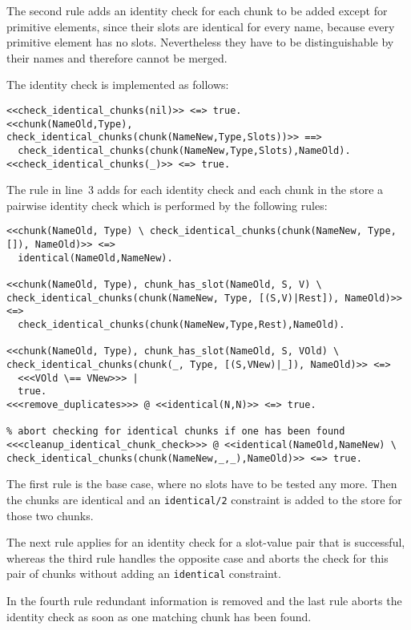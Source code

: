The second rule adds an identity check for each chunk to be added except for primitive elements, since their slots are identical for every name, because every primitive element has no slots. Nevertheless they have to be distinguishable by their names and therefore cannot be merged.

The identity check is implemented as follows:

\begin{lstlisting}
<<check_identical_chunks(nil)>> <=> true.
<<chunk(NameOld,Type), check_identical_chunks(chunk(NameNew,Type,Slots))>> ==> 
  check_identical_chunks(chunk(NameNew,Type,Slots),NameOld).  
<<check_identical_chunks(_)>> <=> true.
\end{lstlisting}

The rule in line~3 adds for each identity check and each chunk in the store a pairwise identity check which is performed by the following rules:

\begin{lstlisting}
<<chunk(NameOld, Type) \ check_identical_chunks(chunk(NameNew, Type, []), NameOld)>> <=> 
  identical(NameOld,NameNew).
  
<<chunk(NameOld, Type), chunk_has_slot(NameOld, S, V) \ check_identical_chunks(chunk(NameNew, Type, [(S,V)|Rest]), NameOld)>> <=> 
  check_identical_chunks(chunk(NameNew,Type,Rest),NameOld).
  
<<chunk(NameOld, Type), chunk_has_slot(NameOld, S, VOld) \ check_identical_chunks(chunk(_, Type, [(S,VNew)|_]), NameOld)>> <=> 
  <<<VOld \== VNew>>> |
  true.
<<<remove_duplicates>>> @ <<identical(N,N)>> <=> true.

% abort checking for identical chunks if one has been found
<<<cleanup_identical_chunk_check>>> @ <<identical(NameOld,NameNew) \ check_identical_chunks(chunk(NameNew,_,_),NameOld)>> <=> true.
\end{lstlisting}

The first rule is the base case, where no slots have to be tested any more. Then the chunks are identical and an \lstinline|identical/2| constraint is added to the store for those two chunks.

The next rule applies for an identity check for a slot-value pair that is successful, whereas the third rule handles the opposite case and aborts the check for this pair of chunks without adding an \lstinline|identical| constraint.

In the fourth rule redundant information is removed and the last rule aborts the identity check as soon as one matching chunk has been found.

